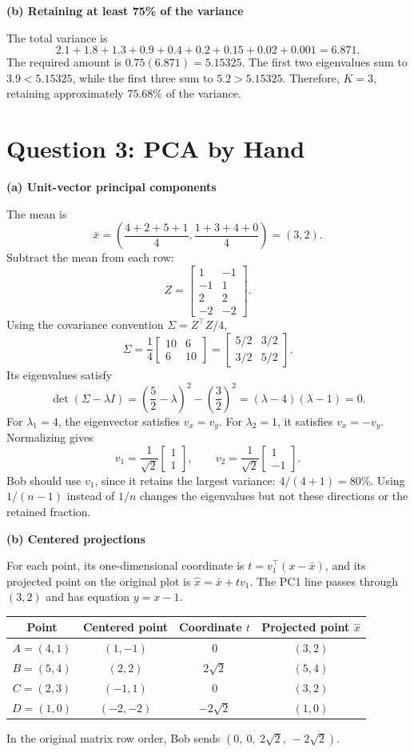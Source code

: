 \documentclass[11pt]{article}
\newcommand{\parttitle}[1]{\par\textbf{#1}\par}
\begin{document}
\parttitle{(b) Retaining at least 75\% of the variance}
The total variance is
\[
2.1+1.8+1.3+0.9+0.4+0.2+0.15+0.02+0.001=6.871.
\]
The required amount is $0.75(6.871)=5.15325$.
The first two eigenvalues sum to $3.9<5.15325$, while the first three sum to
$5.2>5.15325$. Therefore, $\boxed{K=3}$, retaining approximately $75.68\%$ of the variance.

\newpage
\section*{Question 3: PCA by Hand}
\parttitle{(a) Unit-vector principal components}
The mean is
\[
\bar{x}=\left(\frac{4+2+5+1}{4},\frac{1+3+4+0}{4}\right)=(3,2).
\]
Subtract the mean from each row:
\[
Z=\begin{bmatrix}1&-1\\-1&1\\2&2\\-2&-2\end{bmatrix}.
\]
Using the covariance convention $\Sigma=Z^\top Z/4$,
\[
\Sigma=\frac14\begin{bmatrix}10&6\\6&10\end{bmatrix}
=\begin{bmatrix}5/2&3/2\\3/2&5/2\end{bmatrix}.
\]
Its eigenvalues satisfy
\[
\det(\Sigma-\lambda I)
=\left(\frac52-\lambda\right)^2-\left(\frac32\right)^2
=(\lambda-4)(\lambda-1)=0.
\]
For $\lambda_1=4$, the eigenvector satisfies $v_x=v_y$.
For $\lambda_2=1$, it satisfies $v_x=-v_y$. Normalizing gives
\[
\boxed{v_1=\frac1{\sqrt2}\begin{bmatrix}1\\1\end{bmatrix}},\qquad
\boxed{v_2=\frac1{\sqrt2}\begin{bmatrix}1\\-1\end{bmatrix}}.
\]
Bob should use $v_1$, since it retains the largest variance: $4/(4+1)=80\%$.
Using $1/(n-1)$ instead of $1/n$ changes the eigenvalues but not these directions or the retained fraction.

\parttitle{(b) Centered projections}
For each point, its one-dimensional coordinate is
$t=v_1^\top(x-\bar{x})$, and its projected point on the original plot is
$\hat{x}=\bar{x}+tv_1$. The PC1 line passes through $(3,2)$ and has equation $y=x-1$.
\begin{center}
\begin{tabular}{cccc}
\toprule
Point & Centered point & Coordinate $t$ & Projected point $\hat{x}$ \\
\midrule
$A=(4,1)$ & $(1,-1)$ & $0$ & $(3,2)$ \\
$B=(5,4)$ & $(2,2)$ & $2\sqrt2$ & $(5,4)$ \\
$C=(2,3)$ & $(-1,1)$ & $0$ & $(3,2)$ \\
$D=(1,0)$ & $(-2,-2)$ & $-2\sqrt2$ & $(1,0)$ \\
\bottomrule
\end{tabular}
\end{center}
In the original matrix row order, Bob sends $\boxed{(0,\ 0,\ 2\sqrt2,\ -2\sqrt2)}$.
\end{document}
